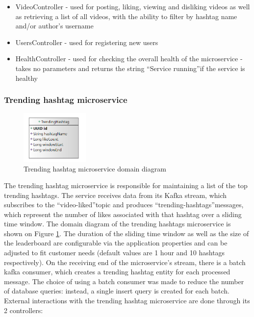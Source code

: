 \documentclass[parskip=full]{article}
\begin{document}
    \begin{itemize}
        \item VideoController - used for posting, liking, viewing and disliking videos as well as retrieving a list of all videos, with the ability to filter by hashtag name and/or author's username
        \item UsersController - used for registering new users
        \item HealthController - used for checking the overall health of the microservice - takes no parameters and returns the string ``Service running''if the service is healthy
    \end{itemize}

    \subsubsection{Trending hashtag microservice}

    \begin{figure}
        \includegraphics[width=0.3\textwidth]{thm-domain-diagram}
        \caption{Trending hashtag microservice domain diagram}
        \label{fig:thmDomain}
    \end{figure}
    The trending hashtag microservice is responsible for maintaining a list of the top trending hashtags.
    The service receives data from its Kafka stream, which subscribes to the ``video-liked''topic and produces ``trending-hashtags''messages, which represent the number of likes associated with that hashtag over a sliding time window.
    The domain diagram of the trending hashtags microservice is shown on Figure \ref{fig:thmDomain}.
    The duration of the sliding time window as well as the size of the leaderboard are configurable via the application properties and can be adjusted to fit customer needs (default values are 1 hour and 10 hashtags respectively).
    On the receiving end of the microservice's stream, there is a batch kafka consumer, which creates a trending hashtag entity for each processed message.
    The choice of using a batch consumer was made to reduce the number of database queries: instead, a single insert query is created for each batch.
    External interactions with the trending hashtag microservice are done through its 2 controllers:
\end{document}
